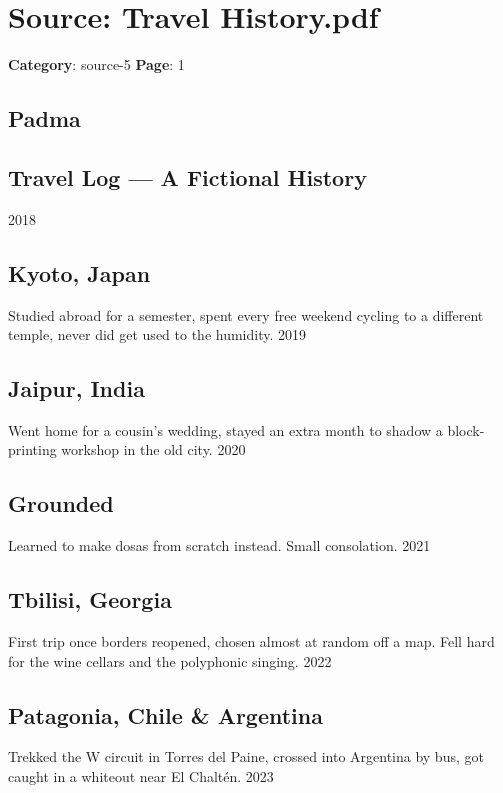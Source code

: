 \section*{Source: Travel History.pdf}
\textbf{Category}: source-5
\textbf{Page}: 1

\subsection*{Padma}

\subsection*{Travel Log — A Fictional History}

2018

\subsection*{Kyoto, Japan}

Studied abroad for a semester, spent every free weekend cycling to a different temple, never did get used to the humidity. 2019

\subsection*{Jaipur, India}

Went home for a cousin's wedding, stayed an extra month to shadow a block-printing workshop in the old city. 2020

\subsection*{Grounded}

Learned to make dosas from scratch instead. Small consolation. 2021

\subsection*{Tbilisi, Georgia}

First trip once borders reopened, chosen almost at random off a map. Fell hard for the wine cellars and the polyphonic singing. 2022

\subsection*{Patagonia, Chile \& Argentina}

Trekked the W circuit in Torres del Paine, crossed into Argentina by bus, got caught in a whiteout near El Chaltén. 2023

